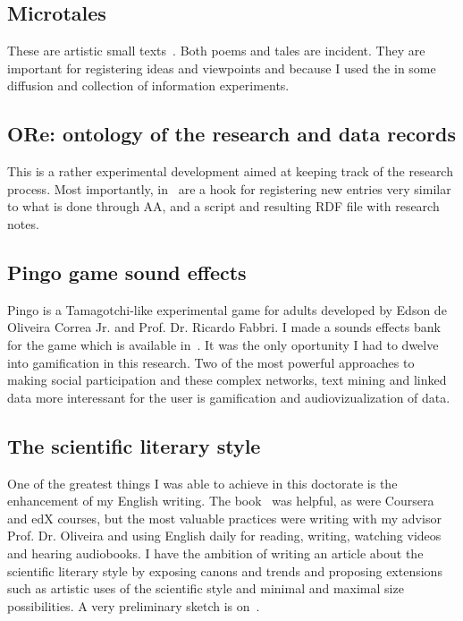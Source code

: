 \begin{apendicesenv}
\subsection{Microtales}
These are artistic small texts~\cite{microcontos}.
Both poems and tales are incident.
They are important for registering ideas and viewpoints
and because I used the in some diffusion and collection of information experiments.

\subsection{ORe: ontology of the research and data records}
This is a rather experimental development aimed at keeping track
of the research process.
Most importantly, in~\cite{ore} are a hook for registering new entries
very similar to what is done through AA, and a script and resulting RDF file
with research notes.

\subsection{Pingo game sound effects}
Pingo is a Tamagotchi-like experimental game for adults
developed by Edson de Oliveira Correa Jr. and Prof. Dr. Ricardo Fabbri.
I made a sounds effects bank for the game which is available in~\cite{pingo}.
It was the only oportunity I had to dwelve into gamification in this research.
Two of the most powerful approaches to making social participation and
these complex networks, text mining and linked data more interessant for the
user is gamification and audiovizualization of data.

\subsection{The scientific literary style}
One of the greatest things I was able to achieve in this doctorate
is the enhancement of my English writing.
The book~\cite{chuLivro} was helpful, as were Coursera and edX courses,
but the most valuable practices were writing with my advisor Prof. Dr. Oliveira
and using English daily for reading, writing, watching videos and hearing audiobooks.
I have the ambition of writing an article about the scientific literary style
by exposing canons and trends and proposing extensions such as artistic uses
of the scientific style and minimal and maximal size possibilities.
A very preliminary sketch is on~\cite{sciStyle}.


\end{apendicesenv}
